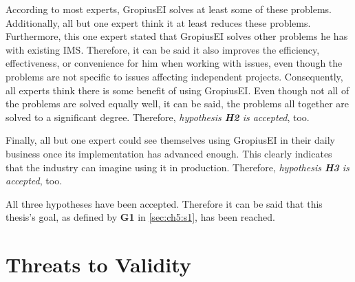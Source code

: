 According to most experts, \gls{GropiusEI} solves at least some of these problems.
Additionally, all but one expert think it at least reduces these problems.
Furthermore, this one expert stated that \gls{GropiusEI} solves other problems he has with existing \gls{IMS}.
Therefore, it can be said it also improves the efficiency, effectiveness, or convenience for him when working with issues,
even though the problems are not specific to issues affecting independent projects.
Consequently, all experts think there is some benefit of using \gls{GropiusEI}.
Even though not all of the problems are solved equally well, it can be said, the problems all together are solved to a significant degree.
Therefore, \emph{hypothesis \textbf{H2} is accepted}, too.

Finally, all but one expert could see themselves using \gls{GropiusEI} in their daily business once its implementation has advanced enough.
This clearly indicates that the industry can imagine using it in production.
Therefore, \emph{hypothesis \textbf{H3} is accepted}, too.

All three hypotheses have been accepted. Therefore it can be said that this thesis's goal, as defined by \textbf{G1} in \cref{sec:ch5:s1}, has been reached.

\section{Threats to Validity}
\label{sec:ch5:s4}

